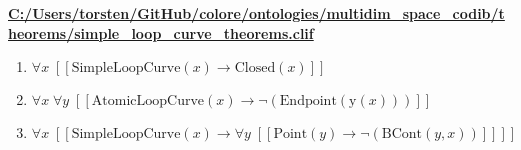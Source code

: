 \documentclass{article}
\begin{document}
\textbf{\url{C:/Users/torsten/GitHub/colore/ontologies/multidim\_space\_codib/theorems/simple\_loop\_curve\_theorems.clif}}

\begin{enumerate}
\item $\forall x\;  \left[ \left[ \textrm{SimpleLoopCurve}(x) \rightarrow \textrm{Closed}(x) \right] \right]$
\item $\forall x\; \forall y\;  \left[ \left[ \textrm{AtomicLoopCurve}(x) \rightarrow \neg \left(\textrm{Endpoint}(\textrm{y}(x))\right) \right] \right]$
\item $\forall x\;  \left[ \left[ \textrm{SimpleLoopCurve}(x) \rightarrow \forall y\;  \left[ \left[ \textrm{Point}(y) \rightarrow \neg \left(\textrm{BCont}(y,x)\right) \right] \right] \right] \right]$
\end{enumerate}
\end{document}
